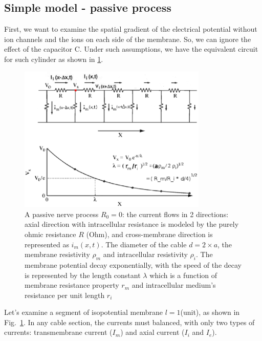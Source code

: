 
\subsection{Simple model - passive process}
\label{sec:simple-model-passive}

First, we want to examine the spatial gradient of the electrical potential
without ion channels and the ions on each side of the membrane. So, we can
ignore the effect of the capacitor C. Under such assumptions, we have the
equivalent circuit for such cylinder as shown in \ref{fig:circuit1}.

\begin{figure}[htb]
\centerline{\includegraphics[height=7cm]{./images/membrane_simplemodel.eps}}
\caption{A passive nerve process $R_0 = 0$: the current flows in 2 directions:
axial direction with intracellular resistance is modeled by the purely ohmic
resistance $R$ (Ohm), and cross-membrane direction is represented as $i_m(x,t)$.
The diameter of the cable $d=2\times a$, the membrane resistivity $\rho_m$ and
intracellular resistivity $\rho_i$. The membrane potential decay exponentially,
with the speed of the decay is represented by the length constant $\lambda$
which is a function of membrane resistance property $r_m$ and intracellular
medium's resistance per unit length $r_i$}\label{fig:circuit1}
\end{figure} 

Let's examine a segment of isopotential membrane $l=1$(unit), as shown in
Fig.~\ref{fig:circuit1}. In any cable section, the currents must balanced,
with only two types of currents: transmembrane current ($I_m$) and axial
current ($I_i$ and $I_e$).
% 

